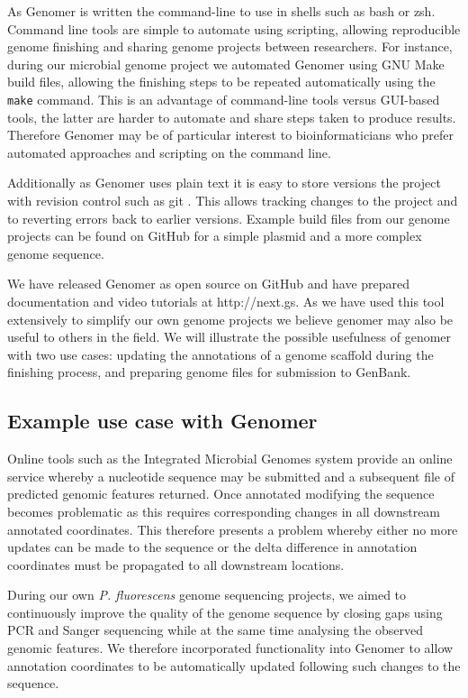 \documentclass[10pt]{article}
\begin{document}
As Genomer is written the command-line to use in shells such as bash or zsh.
Command line tools are simple to automate using scripting, allowing
reproducible genome finishing and sharing genome projects between researchers.
For instance, during our microbial genome project we automated Genomer using
GNU Make build files, allowing the finishing steps to be repeated automatically
using the \verb+make+ command. This is an advantage of command-line tools
versus GUI-based tools, the latter are harder to automate and share steps taken
to produce results. Therefore Genomer may be of particular interest to
bioinformaticians who prefer automated approaches and scripting on the command
line.

Additionally as Genomer uses plain text it is easy to store versions the
project with revision control such as git \cite{git-scm}. This allows tracking
changes to the project and to reverting errors back to earlier versions.
Example build files from our genome projects can be found on GitHub for a
simple plasmid \cite{plasmid-github} and a more complex genome
\cite{genome-github} sequence.

We have released Genomer as open source on GitHub \cite{genomer-github} and
have prepared documentation and video tutorials at http://next.gs. As we have
used this tool extensively to simplify our own genome projects we believe
genomer may also be useful to others in the field. We will illustrate the
possible usefulness of genomer with two use cases: updating the annotations of
a genome scaffold during the finishing process, and preparing genome files for
submission to GenBank.

\subsection*{Example use case with Genomer}

Online tools such as the Integrated Microbial Genomes system
\cite{markowitz2006} provide an online service whereby a nucleotide sequence
may be submitted and a subsequent file of predicted genomic features returned.
Once annotated modifying the sequence becomes problematic as this requires
corresponding changes in all downstream annotated coordinates. This therefore
presents a problem whereby either no more updates can be made to the sequence
or the delta difference in annotation coordinates must be propagated to all
downstream locations.

During our own \emph{P. fluorescens} genome sequencing projects, we aimed to
continuously improve the quality of the genome sequence by closing gaps using
PCR and Sanger sequencing while at the same time analysing the observed genomic
features. We therefore incorporated functionality into Genomer to allow
annotation coordinates to be automatically updated following such changes to
the sequence.
\end{document}

